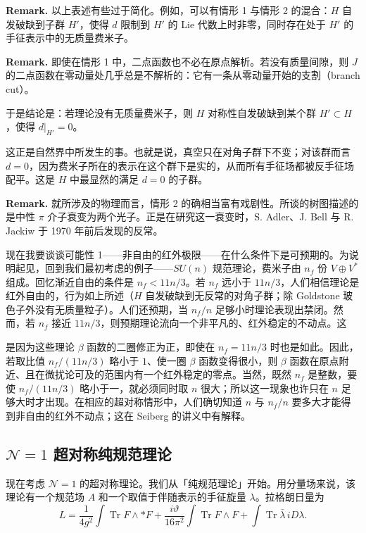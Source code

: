 \textbf{Remark.} 以上表述有些过于简化。例如，可以有情形 1 与情形 2 的混合：$H$ 自发破缺到子群 $H'$，使得 $d$ 限制到 $H'$ 的 Lie 代数上时非零，同时存在处于 $H'$ 的手征表示中的无质量费米子。

\textbf{Remark.} 即使在情形 1 中，二点函数也不必在原点解析。若没有质量间隙，则 $J$ 的二点函数在零动量处几乎总是不解析的：它有一条从零动量开始的支割（branch cut）。

于是结论是：若理论没有无质量费米子，则 $H$ 对称性自发破缺到某个群 $H'\subset H$，使得 $\left.d\right|_{H'}=0$。

这正是自然界中所发生的事。也就是说，真空只在对角子群下不变；对该群而言 $d=0$，因为费米子所在的表示在这个群下是实的，从而所有手征场都被反手征场配平。这是 $H$ 中最显然的满足 $d=0$ 的子群。

\textbf{Remark.} 就所涉及的物理而言，情形 2 的确相当富有戏剧性。所谈的树图描述的是中性 $\pi$ 介子衰变为两个光子。正是在研究这一衰变时，S. Adler、J. Bell 与 R. Jackiw 于 1970 年前后发现的反常。

现在我要谈谈可能性 1——非自由的红外极限——在什么条件下是可预期的。为说明起见，回到我们最初考虑的例子——$SU(n)$ 规范理论，费米子由 $n_f$ 份 $V\oplus V^*$ 组成。回忆渐近自由的条件是 $n_f<11n/3$。若 $n_f$ 远小于 $11n/3$，人们相信理论是红外自由的，行为如上所述（$H$ 自发破缺到无反常的对角子群；除 Goldstone 玻色子外没有无质量粒子）。人们还预期，当 $n_f/n$ 足够小时理论表现出禁闭。然而，若 $n_f$ 接近 $11n/3$，则预期理论流向一个非平凡的、红外稳定的不动点。这


是因为这些理论 $\beta$ 函数的二圈修正为正，即使在 $n_f=11n/3$ 时也是如此。因此，若取比值 $n_f/(11n/3)$ 略小于 $1$、使一圈 $\beta$ 函数变得很小，则 $\beta$ 函数在原点附近、且在微扰论可及的范围内有一个红外稳定的零点。当然，既然 $n_f$ 是整数，要使 $n_f/(11n/3)$ 略小于一，就必须同时取 $n$ 很大；所以这一现象也许只在 $n$ 足够大时才出现。在相应的超对称情形中，人们确切知道 $n$ 与 $n_f/n$ 要多大才能得到非自由的红外不动点；这在 Seiberg 的讲义中有解释。

\subsection{$\mathcal{N}=1$ 超对称纯规范理论}

现在考虑 $\mathcal{N}=1$ 的超对称理论。我们从「纯规范理论」开始。用分量场来说，该理论有一个规范场 $A$ 和一个取值于伴随表示的手征旋量 $\lambda$。拉格朗日量为
\[
L=\frac{1}{4g^2}\int\operatorname{Tr}F\wedge *F+\frac{i\vartheta}{16\pi^2}\int\operatorname{Tr}F\wedge F+\int\operatorname{Tr}\bar\lambda\, iD\lambda .
\]


